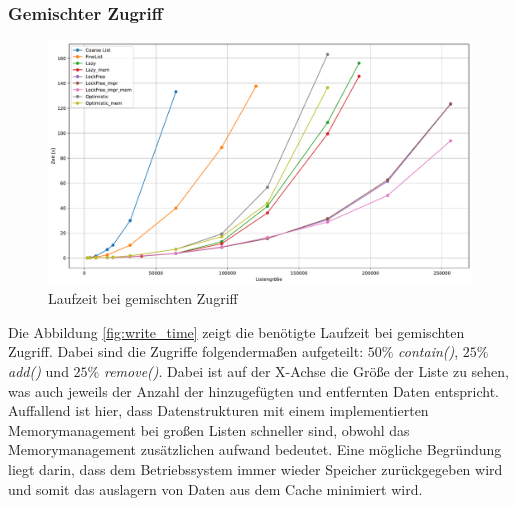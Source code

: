 \subsubsection{Gemischter Zugriff}
\begin{figure}[ht!]
	\centering
	\includegraphics[width=1.0\linewidth]{./plots_pdf/mixed_time} 
	\caption{Laufzeit bei gemischten Zugriff}
	\label{fig:mixed_time} 
\end{figure}
Die Abbildung \ref{fig:write_time} zeigt die benötigte Laufzeit bei gemischten Zugriff. Dabei sind die Zugriffe folgendermaßen aufgeteilt:
 $50\%$ \textit{contain()}, $25\%$ \textit{add()} und $25\%$ \textit{remove()}.
 Dabei ist auf der X-Achse die Größe der Liste zu sehen, was auch jeweils der Anzahl der hinzugefügten und entfernten Daten entspricht. 
 Auffallend ist hier, dass Datenstrukturen mit einem implementierten Memorymanagement bei großen Listen schneller sind, obwohl
 das Memorymanagement zusätzlichen aufwand bedeutet. Eine mögliche Begründung liegt darin, dass dem Betriebssystem immer wieder 
 Speicher zurückgegeben wird und somit das auslagern von Daten aus dem Cache minimiert wird.

